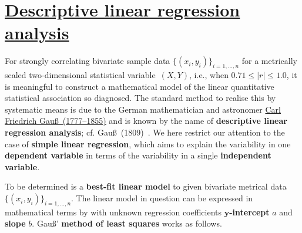 \chapter[Descriptive linear regression analysis]{\href{https://www.youtube.com/watch?v=uMpJZ2g0e3E}{Descriptive linear regression analysis}}
For strongly correlating bivariate sample data 
$\{(x_{i},y_{i})\}_{i=1,\ldots,n}$ for a metrically scaled 
two-dimensional statistical variable~$(X,Y)$, i.e., when $0.71 
\leq |r| \leq 1.0$, it is meaningful to construct a mathematical 
model of the linear quantitative statistical association so 
diagnosed. The standard method to realise this by systematic means 
is due to the German mathematician and astronomer 
\href{http://www-groups.dcs.st-and.ac.uk/~history/Biographies/Gauss.html}{Carl Friedrich Gau\ss\ (1777--1855)} and is known by the 
name of \textbf{descriptive linear regression analysis};
cf. Gau\ss\ (1809)~. We here restrict our attention to
the case of \textbf{simple linear regression}, which aims to
explain the variability in one \textbf{dependent variable} in terms
of the variability in a single \textbf{independent variable}.

\medskip
\noindent
To be determined is a \textbf{best-fit linear model} to given 
bivariate metrical data
$\{(x_{i},y_{i})\}_{i=1,\ldots,n}$. The linear model in question 
can be expressed in mathematical terms by
%
\be
{}
\ee
%
with unknown regression coefficients
\textbf{$\boldsymbol{y}$-intercept} $a$ and \textbf{slope} $b$.
Gau\ss' \textbf{method of least squares} works as follows.

